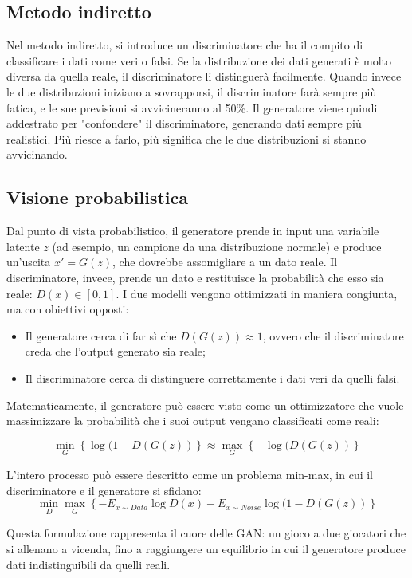 \subsection{Metodo indiretto}

Nel metodo indiretto, si introduce un discriminatore che ha il compito di classificare i dati come veri o falsi. Se la distribuzione dei dati generati è molto diversa da quella reale, il discriminatore li distinguerà facilmente. Quando invece le due distribuzioni iniziano a sovrapporsi, il discriminatore farà sempre più fatica, e le sue previsioni si avvicineranno al 50\%. Il generatore viene quindi addestrato per "confondere" il discriminatore, generando dati sempre più realistici. Più riesce a farlo, più significa che le due distribuzioni si stanno avvicinando.

\subsection{Visione probabilistica}

Dal punto di vista probabilistico, il generatore prende in input una variabile latente $z$ (ad esempio, un campione da una distribuzione normale) e produce un’uscita $x' = G(z)$, che dovrebbe assomigliare a un dato reale. Il discriminatore, invece, prende un dato e restituisce la probabilità che esso sia reale: $D(x) \in [0,1]$. I due modelli vengono ottimizzati in maniera congiunta, ma con obiettivi opposti:
\begin{itemize}
    \item Il generatore cerca di far sì che $D(G(z)) \approx 1$, ovvero che il discriminatore creda che l’output generato sia reale;
    \item Il discriminatore cerca di distinguere correttamente i dati veri da quelli falsi.
\end{itemize}

Matematicamente, il generatore può essere visto come un ottimizzatore che vuole massimizzare la probabilità che i suoi output vengano classificati come reali:

\begin{equation}
    \min_G \left\{ \log(1-D(G(z))\right\}\approx \max_G\left\{-\log(D(G(z))\right\}
\end{equation}

L’intero processo può essere descritto come un problema min-max, in cui il discriminatore e il generatore si sfidano:
\begin{equation}
    \min_D\max_G\left\{-E_{x\sim Data} \log D(x) - E_{x\sim Noise}\log(1-D(G(z))\right\}
\end{equation}

Questa formulazione rappresenta il cuore delle GAN: un gioco a due giocatori che si allenano a vicenda, fino a raggiungere un equilibrio in cui il generatore produce dati indistinguibili da quelli reali.
